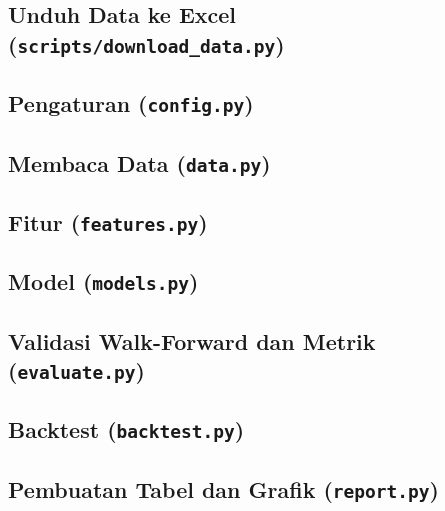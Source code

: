 \documentclass[11pt,a4paper]{article}
\begin{document}
\subsection{Unduh Data ke Excel (\texttt{scripts/download\_data.py})}


\subsection{Pengaturan (\texttt{config.py})}


\subsection{Membaca Data (\texttt{data.py})}


\subsection{Fitur (\texttt{features.py})}


\subsection{Model (\texttt{models.py})}


\subsection{Validasi Walk-Forward dan Metrik (\texttt{evaluate.py})}


\subsection{Backtest (\texttt{backtest.py})}


\subsection{Pembuatan Tabel dan Grafik (\texttt{report.py})}

\end{document}
